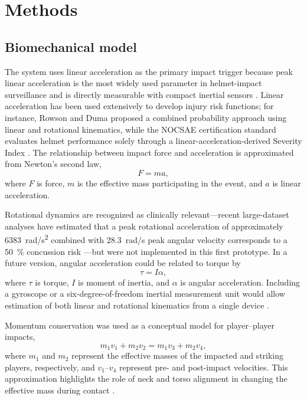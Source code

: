 \documentclass[11pt]{article}
\begin{document}
\section{Methods}
\subsection{Biomechanical model}
The system uses linear acceleration as the primary impact trigger because peak linear acceleration is the most widely used parameter in helmet-impact surveillance and is directly measurable with compact inertial sensors \citep{guskiewicz2007measurement,pellman2003location}. Linear acceleration has been used extensively to develop injury risk functions; for instance, Rowson and Duma \citep{rowson2013brain} proposed a combined probability approach using linear and rotational kinematics, while the NOCSAE certification standard evaluates helmet performance solely through a linear-acceleration-derived Severity Index \citep{nocsae2024droptest}. The relationship between impact force and acceleration is approximated from Newton's second law,
\begin{equation}
F = m a,
\end{equation}
where $F$ is force, $m$ is the effective mass participating in the event, and $a$ is linear acceleration.

Rotational dynamics are recognized as clinically relevant---recent large-dataset analyses have estimated that a peak rotational acceleration of approximately \SI{6383}{rad/s^2} combined with \SI{28.3}{rad/s} peak angular velocity corresponds to a \SI{50}{\percent} concussion risk \citep{cecchi2023rotational}---but were not implemented in this first prototype. In a future version, angular acceleration could be related to torque by
\begin{equation}
\tau = I\alpha,
\end{equation}
where $\tau$ is torque, $I$ is moment of inertia, and $\alpha$ is angular acceleration. Including a gyroscope or a six-degree-of-freedom inertial measurement unit would allow estimation of both linear and rotational kinematics from a single device \citep{rowson2012headkinematics}.

Momentum conservation was used as a conceptual model for player--player impacts,
\begin{equation}
 m_1 v_1 + m_2 v_2 = m_1 v_3 + m_2 v_4,
\end{equation}
where $m_1$ and $m_2$ represent the effective masses of the impacted and striking players, respectively, and $v_1$--$v_4$ represent pre- and post-impact velocities. This approximation highlights the role of neck and torso alignment in changing the effective mass during contact \citep{viano2007struck,viano2005striking}.
\end{document}
